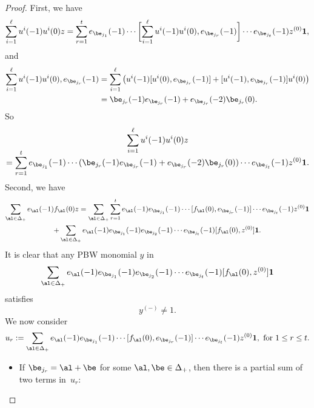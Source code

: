 \begin{proof}
First, we have\vspace*{-3pt}
\begin{equation*}
\sum_{i=1}^{\ell} u^i(-1)u^i(0) z
= \sum_{r=1}^t
e_{\be_{j_1}}(-1) \cdots \biggl[\sum_{i=1}^{\ell}u^i(-1)u^i(0), e_{\be_{j_r}}(-1)\biggr] \cdots e_{\be_{j_t}}(-1) z^{(0)} \mathbf{1},
\end{equation*}
and\vspace*{-3pt}
\begin{align*}
\sum_{i=1}^{\ell}u^i(-1)u^i(0), e_{\be_{j_r}}(-1)& = \sum_{i=1}^{\ell}\left(u^i(-1) [u^i(0), e_{\be_{j_r}}(-1)] + [u^i(-1), e_{\be_{j_r}}(-1)] u^i(0) \right)\\
& = \be_{j_r}(-1) e_{\be_{j_r}}(-1) + e_{\be_{j_r}}(-2) \be_{j_r}(0).
\end{align*}
So\vspace*{-5pt}
\begin{multline}\label{e37}
\sum_{i=1}^{\ell} u^i(-1)u^i(0) z\\[-8pt]
= \sum_{r=1}^t
e_{\be_{j_1}}(-1) \cdots (\be_{j_r}(-1) e_{\be_{j_r}}(-1) + e_{\be_{j_r}}(-2) \be_{j_r}(0)) \cdots e_{\be_{j_t}}(-1) z^{(0)} \mathbf{1}.
\end{multline}
Second, we have\vspace*{-5pt}
\begin{multline*}
\sum_{\al\in{\Delta}_+}e_{\al}(-1) f_{\al}(0) z
= \sum_{\al\in{\Delta}_+} \sum_{r=1}^te_{\al}(-1)
e_{\be_{j_1}}(-1) \cdots [f_{\al}(0),e_{\be_{j_r}}(-1)] \cdots e_{\be_{j_t}}(-1) z^{(0)} \mathbf{1} \\
+ \sum_{\al\in{\Delta}_+} e_{\al}(-1)e_{\be_{j_1}}(-1)e_{\be_{j_2}}(-1)\cdots e_{\be_{j_t}}(-1)
[f_{\al}(0),z^{(0)} ] \mathbf{1}.
\end{multline*}
It is clear that
any PBW monomial $y$ in\vspace*{-3pt}
\[
\sum_{\al\in{\Delta}_+}e_{\al}(-1) e_{\be_{j_1}}(-1)e_{\be_{j_2}}(-1)\cdots e_{\be_{j_t}}(-1)
[f_{\al}(0),z^{(0)} ] \mathbf{1}
\]
satisfies\vspace*{-3pt}
\begin{equation}\label{e38}
y^{(-)} \not= 1.
\end{equation}
We now consider
\[
u_r:=\sum_{\al\in{\Delta}_+}
e_{\al}(-1)e_{\be_{j_1}}(-1) \cdots [f_{\al}(0),e_{\be_{j_r}}(-1)] \cdots e_{\be_{j_t}}(-1) z^{(0)} \mathbf{1}, \text{ for } 1\leq r\leq t.
\]
\begin{itemize}
\item
If $\be_{j_r}=\al+\be$ for some $\al,\be\in\Delta_{+}$, then there is a partial sum of two terms in~$u_r$:

\end{itemize}
\end{proof}
